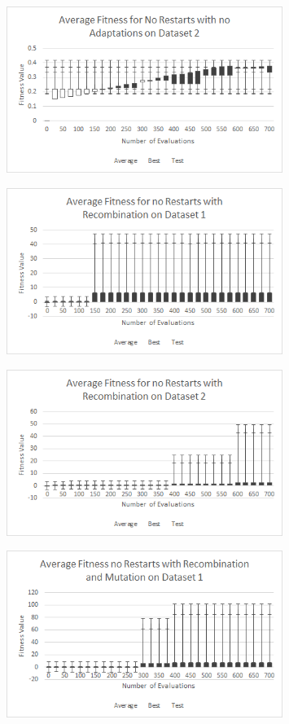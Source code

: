 \documentclass{article}
\begin{document}
\begin{figure}[h]
	\centering
	\includegraphics[width=0.8\textwidth]{res0adaptNoDS2}
\end{figure}
\newpage
\begin{figure}[h]
	\centering
	\includegraphics[width=0.8\textwidth]{res0adaptReDS1}
\end{figure}
\begin{figure}[h]
	\centering
	\includegraphics[width=0.8\textwidth]{res0adaptReDS2}
\end{figure}
\newpage
\begin{figure}[h]
	\centering
	\includegraphics[width=0.8\textwidth]{res0adaptReMuDS1}
\end{figure}
\end{document}
